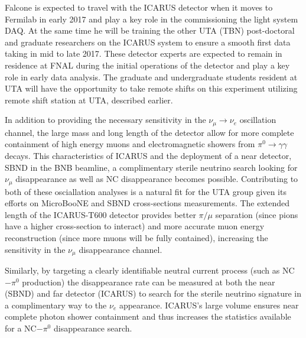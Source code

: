 Falcone is expected to travel with the ICARUS detector when it moves to Fermilab in early 2017 and play a key role in the commissioning the light system DAQ. At the same time he will be training the other UTA (TBN) post-doctoral and graduate researchers on the ICARUS system to ensure a smooth first data taking in mid to late 2017. These detector experts are expected to remain in residence at FNAL during the initial operations of the detector and play a key role in early data analysis. The graduate and undergraduate students resident at UTA will have the opportunity to take remote shifts on this experiment utilizing remote shift station at UTA, described earlier.

\label{sec:ICARUSDataAnalysis}
In addition to providing the necessary sensitivity in the $\nu_{\mu} \rightarrow \nu_{e}$ oscillation channel, the large mass and long length of the detector allow for more complete containment of high energy muons and electromagnetic showers from $\pi^{0} \rightarrow \gamma \gamma$ decays.  This characteristics of ICARUS and the deployment of a near detector, SBND in the BNB beamline, a complimentary sterile neutrino search looking for $\nu_{\mu}$  disappearance as well as  NC disappearance becomes possible. Contributing to both of these osciallation analyses is a natural fit for the UTA group given its efforts on MicroBooNE and SBND cross-sections measurements. The extended length of the ICARUS-T600 detector provides better $\pi / \mu$ separation (since pions have a higher cross-section to interact) and more accurate muon energy reconstruction (since more muons will be fully contained), increasing the sensitivity in the $\nu_{\mu}$ disappearance channel. 

Similarly, by targeting a clearly identifiable neutral current process (such as NC$-\pi^{0}$ production) the disappearance rate can be measured at both the near (SBND) and far detector (ICARUS) to search for the sterile neutrino signature in a complimentary way to the $\nu_{e}$ appearance. ICARUS's large volume ensures near complete photon shower containment and thus increases the statistics available for a NC$-\pi^{0}$ disappearance search.

